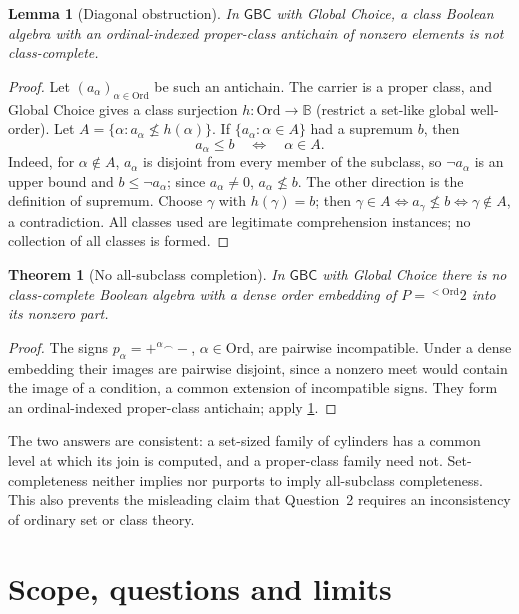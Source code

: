 \documentclass[11pt,letterpaper]{article}
\numberwithin{equation}{section}
\newtheorem{theorem}{Theorem}[section]
\newtheorem{lemma}[lemma]{Lemma}
\theoremstyle{definition}
\theoremstyle{remark}
\newcommand{\Ord}{\mathrm{Ord}}
\newcommand{\cat}{\mathbin{{}^{\frown}}}
\newcommand{\GBC}{\mathsf{GBC}}
\begin{document}
\begin{lemma}[Diagonal obstruction]\label{univ:lem:classdiag}
In $\GBC$ with Global Choice, a class Boolean algebra with an ordinal-indexed
proper-class antichain of nonzero elements is not class-complete.
\end{lemma}
\begin{proof}
Let $(a_\alpha)_{\alpha\in\Ord}$ be such an antichain. The carrier is a proper
class, and Global Choice gives a class surjection $h:\Ord\to\mathbb B$ (restrict
a set-like global well-order). Let $A=\{\alpha:a_\alpha\not\leq h(\alpha)\}$. If
$\{a_\alpha:\alpha\in A\}$ had a supremum $b$, then
\begin{equation}\label{univ:eq:diagiff}
 a_\alpha\leq b\quad\Longleftrightarrow\quad\alpha\in A.
\end{equation}
Indeed, for $\alpha\notin A$, $a_\alpha$ is disjoint from every member of the
subclass, so $\neg a_\alpha$ is an upper bound and $b\leq\neg a_\alpha$; since
$a_\alpha\ne0$, $a_\alpha\not\leq b$. The other direction is the definition of
supremum. Choose $\gamma$ with $h(\gamma)=b$; then
$\gamma\in A\Leftrightarrow a_\gamma\not\leq b\Leftrightarrow\gamma\notin A$, a
contradiction. All classes used are legitimate comprehension instances; no
collection of all classes is formed.
\end{proof}

\begin{theorem}[No all-subclass completion]\label{univ:thm:booleanno}
In $\GBC$ with Global Choice there is no class-complete Boolean algebra with a
dense order embedding of $P={}^{<\Ord}2$ into its nonzero part.
\end{theorem}
\begin{proof}
The signs $p_\alpha=+^\alpha\cat-$, $\alpha\in\Ord$, are pairwise incompatible.
Under a dense embedding their images are pairwise disjoint, since a nonzero
meet would contain the image of a condition, a common extension of
incompatible signs. They form an ordinal-indexed proper-class antichain; apply
\cref{univ:lem:classdiag}.
\end{proof}

The two answers are consistent: a set-sized family of cylinders has a common
level at which its join is computed, and a proper-class family need not.
Set-completeness neither implies nor purports to imply all-subclass
completeness. This also prevents the misleading claim that Question~2 requires
an inconsistency of ordinary set or class theory.

\part{Scope, questions and limits}\label{univ:part:scope}
\end{document}
